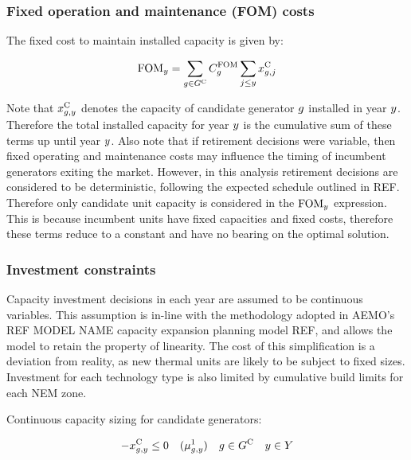 \documentclass{article}
\begin{document}
\subsubsection{Fixed operation and maintenance (FOM) costs}
The fixed cost to maintain installed capacity is given by:

\begin{equation}
\cFixedOperationsMaintenanceCost = \sum\limits_{\iGenerator \in \sGeneratorsCandidate} \cFixedOperationsMaintenanceCostGenerator \sum\limits_{\iYearAlias \leq \iYear} \vInstalledCapacity[\iGenerator,\iYearAlias]
\end{equation}

Note that $\vInstalledCapacity$ denotes the capacity of candidate generator $\iGenerator$ installed in year $\iYear$. Therefore the total installed capacity for year $\iYear$ is the cumulative sum of these terms up until year $\iYear$. Also note that if retirement decisions were variable, then fixed operating and maintenance costs may influence the timing of incumbent generators exiting the market. However, in this analysis retirement decisions are considered to be deterministic, following the expected schedule outlined in REF. Therefore only candidate unit capacity is considered in the $\cFixedOperationsMaintenanceCost$ expression. This is because incumbent units have fixed capacities and fixed costs, therefore these terms reduce to a constant and have no bearing on the optimal solution. 

\subsubsection{Investment constraints}
Capacity investment decisions in each year are assumed to be continuous variables. This assumption is in-line with the methodology adopted in AEMO's REF MODEL NAME capacity expansion planning model REF, and allows the model to retain the property of linearity. The cost of this simplification is a deviation from reality, as new thermal units are likely to be subject to fixed sizes. Investment for each technology type is also limited by cumulative build limits for each NEM zone.

Continuous capacity sizing for candidate generators:

\begin{equation}
- \vInstalledCapacity[\iGenerator,\iYear] \leq 0 \quad (\dNonNegativeCandidateCapacity) \quad  \iGenerator \in \sGeneratorsCandidate \quad  \iYear \in \sYears
\label{eqn: non-negative installed capacity}
\end{equation}
\end{document}

